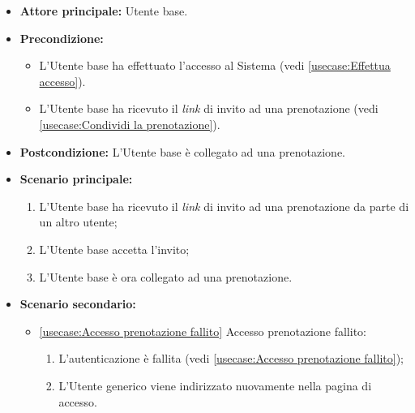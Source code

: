 \label{usecase:Accedi alla prenotazione}
\begin{itemize}
	\item \textbf{Attore principale:} Utente base.

	\item \textbf{Precondizione:} 
	\begin{itemize}
		\item L'Utente base ha effettuato l'accesso al Sistema (vedi \autoref{usecase:Effettua accesso}).
		\item L'Utente base ha ricevuto il \textit{link} di invito ad una prenotazione (vedi \autoref{usecase:Condividi la prenotazione}).
	\end{itemize}
		

	\item \textbf{Postcondizione:} L'Utente base è collegato ad una prenotazione.

	\item \textbf{Scenario principale:}
	      \begin{enumerate}
		      \item L'Utente base ha ricevuto il \textit{link} di invito ad una prenotazione da parte di un altro utente;
		      \item L'Utente base accetta l'invito;
		      \item L'Utente base è ora collegato ad una prenotazione.
	      \end{enumerate}

	\item \textbf{Scenario secondario:}
		  \begin{itemize}
			  \item \autoref{usecase:Accesso prenotazione fallito} Accesso prenotazione fallito:
			  \begin{enumerate}
				  \item L'autenticazione è fallita (vedi \autoref{usecase:Accesso prenotazione fallito});
				  \item L'Utente generico viene indirizzato nuovamente nella pagina di accesso.
			  \end{enumerate}	
		  \end{itemize}
\end{itemize}
